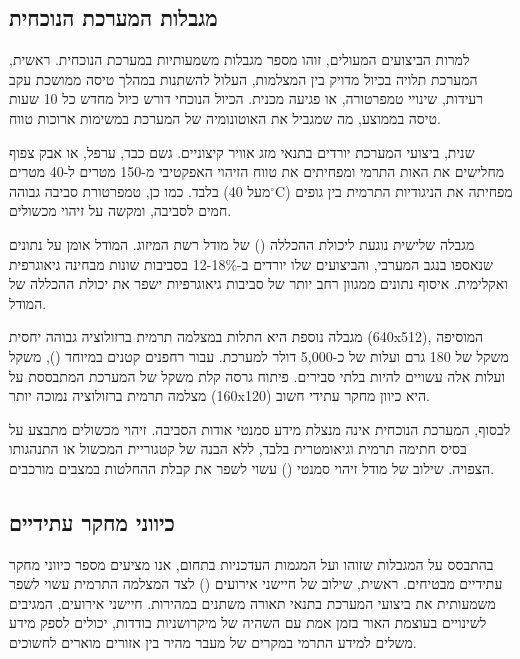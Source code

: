 \subsection{מגבלות המערכת הנוכחית}
\label{sec:ch09_limitations}

למרות הביצועים המעולים, זוהו מספר מגבלות משמעותיות במערכת הנוכחית. ראשית, המערכת תלויה בכיול מדויק בין המצלמות, העלול להשתנות במהלך טיסה ממושכת עקב רעידות, שינויי טמפרטורה, או פגיעה מכנית. הכיול הנוכחי דורש כיול מחדש כל 10 שעות טיסה בממוצע, מה שמגביל את האוטונומיה של המערכת במשימות ארוכות טווח.

שנית, ביצועי המערכת יורדים בתנאי מזג אוויר קיצוניים. גשם כבד, ערפל, או אבק צפוף מחלישים את האות התרמי ומפחיתים את טווח הזיהוי האפקטיבי מ-150 מטרים ל-40 מטרים בלבד. כמו כן, טמפרטורת סביבה גבוהה (מעל 40$^{\circ}$C) מפחיתה את הניגודיות התרמית בין גופים חמים לסביבה, ומקשה על זיהוי מכשולים.

מגבלה שלישית נוגעת ליכולת ההכללה () של מודל רשת המיזוג. המודל אומן על נתונים שנאספו בנגב המערבי, והביצועים שלו יורדים ב-12-18\% בסביבות שונות מבחינה גיאוגרפית ואקלימית. איסוף נתונים ממגוון רחב יותר של סביבות גיאוגרפיות ישפר את יכולת ההכללה של המודל.

מגבלה נוספת היא התלות במצלמה תרמית ברזולוציה גבוהה יחסית (640x512), המוסיפה משקל של 180 גרם ועלות של כ-5,000 דולר למערכת. עבור רחפנים קטנים במיוחד (), משקל ועלות אלה עשויים להיות בלתי סבירים. פיתוח גרסה קלת משקל של המערכת המתבססת על מצלמה תרמית ברזולוציה נמוכה יותר (160x120) היא כיוון מחקר עתידי חשוב.

לבסוף, המערכת הנוכחית אינה מנצלת מידע סמנטי אודות הסביבה. זיהוי מכשולים מתבצע על בסיס חתימה תרמית וגיאומטרית בלבד, ללא הבנה של קטגוריית המכשול או התנהגותו הצפויה. שילוב של מודל זיהוי סמנטי () עשוי לשפר את קבלת ההחלטות במצבים מורכבים.

\subsection{כיווני מחקר עתידיים}
\label{sec:ch09_future_work}

בהתבסס על המגבלות שזוהו ועל המגמות העדכניות בתחום, אנו מציעים מספר כיווני מחקר עתידיים מבטיחים. ראשית, שילוב של חיישני אירועים () לצד המצלמה התרמית עשוי לשפר משמעותית את ביצועי המערכת בתנאי תאורה משתנים במהירות. חיישני אירועים, המגיבים לשינויים בעוצמת האור בזמן אמת עם השהיה של מיקרושניות בודדות, יכולים לספק מידע משלים למידע התרמי במקרים של מעבר מהיר בין אזורים מוארים לחשוכים.

